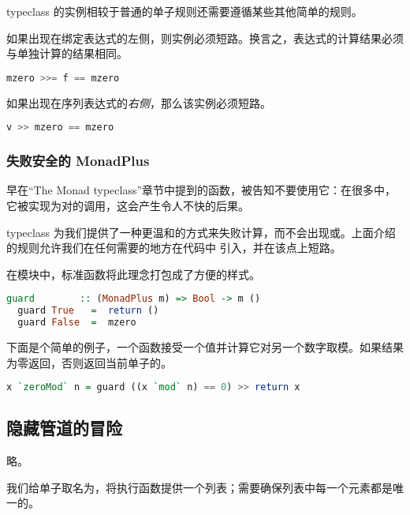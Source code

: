 \documentclass[./main.tex]{subfiles}
\begin{document}
 typeclass 的实例相较于普通的单子规则还需要遵循某些其他简单的规则。

如果出现在绑定表达式的左侧，则实例必须短路。换言之，表达式的计算结果必须与单独计算的结果相同。

\begin{lstlisting}[language=Haskell]
  mzero >>= f == mzero
\end{lstlisting}

如果出现在序列表达式的\textit{右侧}，那么该实例必须短路。

\begin{lstlisting}[language=Haskell]
  v >> mzero == mzero
\end{lstlisting}

\subsubsection*{失败安全的 MonadPlus}

早在“The Monad typeclass”章节中提到的函数，被告知不要使用它：在很多中，它被实现为对的调用，这会产生令人不快的后果。

 typeclass 为我们提供了一种更温和的方式来失败计算，而不会出现或。上面介绍的规则允许我们在任何需要的地方在代码中
引入，并在该点上短路。

在模块中，标准函数将此理念打包成了方便的样式。

\begin{lstlisting}[language=Haskell]
  guard        :: (MonadPlus m) => Bool -> m ()
  guard True   =  return ()
  guard False  =  mzero
\end{lstlisting}

下面是个简单的例子，一个函数接受一个值并计算它对另一个数字取模。如果结果为零返回，否则返回当前单子的。

\begin{lstlisting}[language=Haskell]
  x `zeroMod` n = guard ((x `mod` n) == 0) >> return x
\end{lstlisting}

\subsection*{隐藏管道的冒险}

略。

我们给单子取名为，将执行函数提供一个列表；需要确保列表中每一个元素都是唯一的。
\end{document}
